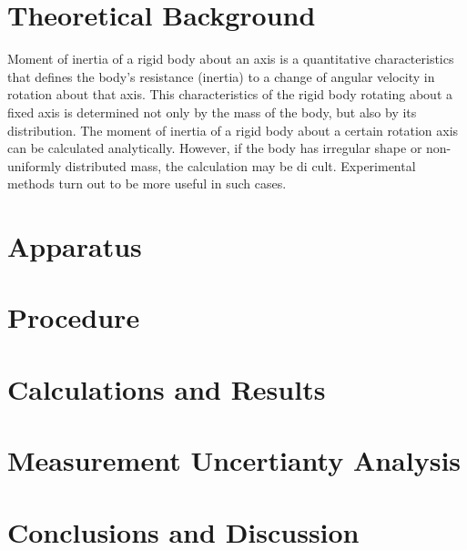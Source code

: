 \documentclass[12pt,a4paper]{article}
\begin{document}


\newpage

\section{Theoretical Background}

Moment of inertia of a rigid body about an axis is a quantitative
characteristics that defines the body’s resistance (inertia) to a change of
angular velocity in rotation about that axis. 
This characteristics of the rigid body rotating about a fixed axis is determined
not only by the mass of the body, but also by its distribution. 
The moment of inertia of a rigid body about a certain rotation axis can be
calculated analytically. 
However, if the body has irregular shape or non-uniformly distributed mass, the
calculation may be di cult.
Experimental methods turn out to be more useful in such cases.

\section{Apparatus}

\section{Procedure}

\section{Calculations and Results}

\section{Measurement Uncertianty Analysis}

\section{Conclusions and Discussion}

\end{document}
